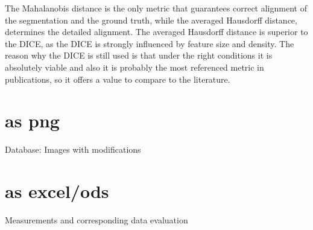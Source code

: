 \documentclass[journal]{IEEEtran}
\begin{document}
The Mahalanobis distance is the only metric that guarantees correct alignment of the segmentation and the ground truth, while the averaged Hausdorff distance, determines the detailed alignment. The averaged Hausdorff distance is superior to the DICE, as the DICE is strongly influenced by feature size and density. The reason why the DICE is still used is that under the right conditions it is absolutely viable and also it is probably the most referenced metric in publications, so it offers a value to compare to the literature.




%


\appendices
\section{as png}
Database: Images with modifications

\section{as excel/ods}
Measurements and corresponding data evaluation

\ifCLASSOPTIONcaptionsoff
  \newpage
\fi
\end{document}
